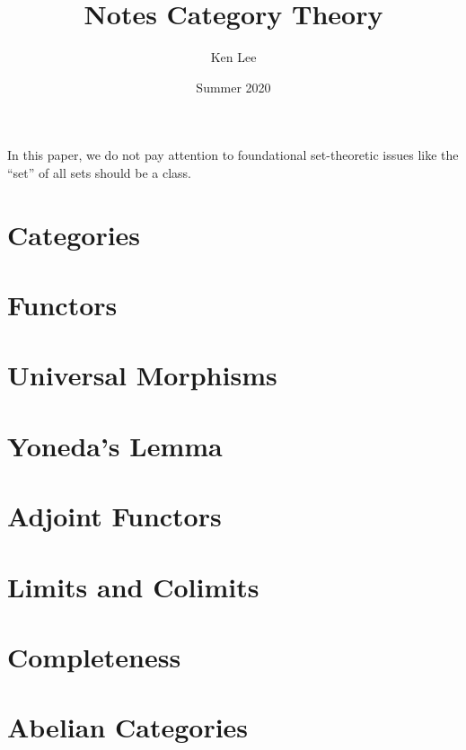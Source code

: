 \documentclass{article}
\newcommand{\<}{\langle}
\renewcommand{\>}{\rangle}
\theoremstyle{definitionstyle}
\theoremstyle{exercisestyle}
\theoremstyle{examplestyle}
\theoremstyle{remarkstyle}
\begin{document}
\title{Notes Category Theory}
\author{Ken Lee}
\date{Summer 2020}
\maketitle

\tableofcontents

In this paper, we do not pay attention to foundational set-theoretic issues
like the ``set'' of all sets should be a class.  

\section{Categories}

\section{Functors}

\section{Universal Morphisms}

\section{Yoneda's Lemma}

\section{Adjoint Functors}

\section{Limits and Colimits}

\section{Completeness}

\section{Abelian Categories}

\end{document}
